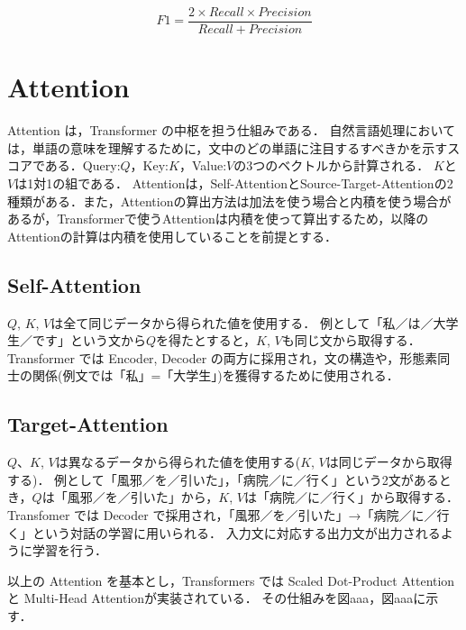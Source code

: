 $$
F1 = \frac{2 \times Recall \times Precision}{Recall+Precision}
$$


\section{Attention \label{c4s3}}
Attention は，Transformer の中枢を担う仕組みである．
自然言語処理においては，単語の意味を理解するために，文中のどの単語に注目するすべきかを示すスコアである．Query:${Q}$，Key:${K}$，Value:${V}$の3つのベクトルから計算される．
${K}$と${V}$は1対1の組である．
Attentionは，Self-AttentionとSource-Target-Attentionの2種類がある．また，Attentionの算出方法は加法を使う場合と内積を使う場合があるが，Transformerで使うAttentionは内積を使って算出するため，以降のAttentionの計算は内積を使用していることを前提とする．

\subsection{Self-Attention \label{c4s3-1a}}
${Q}$, ${K}$, ${V}$は全て同じデータから得られた値を使用する．
例として「私／は／大学生／です」という文から${Q}$を得たとすると，${K}$, ${V}$も同じ文から取得する．Transformer では Encoder, Decoder の両方に採用され，文の構造や，形態素同士の関係(例文では「私」=「大学生」)を獲得するために使用される．

\subsection{Target-Attention \label{c4s3-1b}}
${Q}$、${K}$, ${V}$は異なるデータから得られた値を使用する(${K}$, ${V}$は同じデータから取得する)．
例として「風邪／を／引いた」，「病院／に／行く」という2文があるとき，${Q}$は「風邪／を／引いた」から，${K}$, ${V}$は「病院／に／行く」から取得する．
 Transfomer では Decoder で採用され，「風邪／を／引いた」→「病院／に／行く」という対話の学習に用いられる．
入力文に対応する出力文が出力されるように学習を行う．

以上の Attention を基本とし，Transformers では Scaled Dot-Product Attention と Multi-Head Attentionが実装されている．
その仕組みを図aaa，図aaaに示す．

